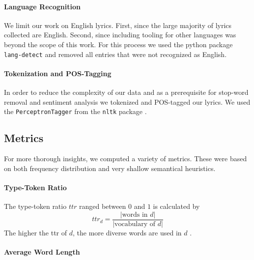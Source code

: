 \documentclass[11pt,a4paper]{article}
\begin{document}
\paragraph{Language Recognition}

We limit our work on English lyrics. First, since the large majority of lyrics collected are English. Second, since including tooling for other languages was beyond the scope of this work. For this process we used the python package \texttt{lang-detect} \citet{danilak_lang_2017} and removed all entries that were not recognized as English.

\paragraph{Tokenization and POS-Tagging}

In order to reduce the complexity of our data and as a prerequisite for stop-word removal and sentiment analysis we tokenized and POS-tagged our lyrics. We used the \texttt{PerceptronTagger} from the \texttt{nltk} package \citep{bird_natural_2009}.


\subsection{Metrics}\label{sec:metrics}

For more thorough insights, we computed a variety of metrics. These were based on both frequency distribution and very shallow semantical heuristics.

\paragraph{Type-Token Ratio}


The type-token ratio $ttr$ ranged between $0$ and $1$ is calculated by 
\begin{equation}
	ttr_{d} = \frac{|\text{words in }d|}{|\text{vocabulary of }d|}
\end{equation}
The higher the ttr of $d$, the more diverse words are used in $d$ \cite{jurafsky2014speech}. 

\paragraph{Average Word Length}
\end{document}
